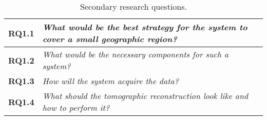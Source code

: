 \begin{table}[htpb]
    \centering
    \caption{Secondary research questions.}
    \label{tab:sec_RQ}
    \begin{tabularx}{0.8\textwidth}{cX}
        \toprule
        \textbf{RQ1.1}&\emph{ What would be the best strategy
        for the system to cover a small geographic region? }\\
        \midrule
        \textbf{RQ1.2}&\emph{ What would be the necessary
        components for such a system? }\\
        \midrule
        \textbf{RQ1.3}&\emph{ How will the system acquire the
        data? }\\
        \midrule
        \textbf{RQ1.4}&\emph{ What should the tomographic
        reconstruction look like and how to perform it? }\\
        \bottomrule
    \end{tabularx}
\end{table}
